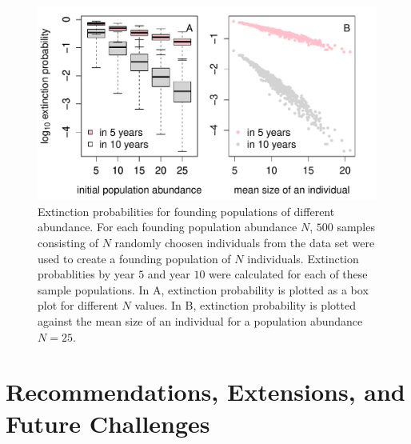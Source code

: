 \documentclass[12pt]{amsart}\usepackage[]{graphicx}\usepackage[]{color}
\makeatletter
\def\maxwidth{ %
  \ifdim\Gin@nat@width>\linewidth
    \linewidth
  \else
    \Gin@nat@width
  \fi
}
\newenvironment{knitrout}{}{} %
\makeatother
\begin{document}
\begin{knitrout}
\color{fgcolor}\begin{figure}
\includegraphics[width=\maxwidth]{figure/sampling-1} \caption[Extinction probabilities for founding populations of different abundance]{Extinction probabilities for founding populations of different abundance. For each founding population abundance $N$, $500$ samples consisting of $N$ randomly choosen individuals from the data set were used to create a founding population of $N$ individuals. Extinction probablities by year $5$ and year $10$ were calculated for each of these sample populations. In A, extinction probability is plotted as a box plot for different $N$ values. In B, extinction probability is plotted against the mean size of an individual for a population abundance $N=25$.}\label{fig:sampling}
\end{figure}


\end{knitrout}

\section*{Recommendations, Extensions, and Future Challenges}
\end{document}
